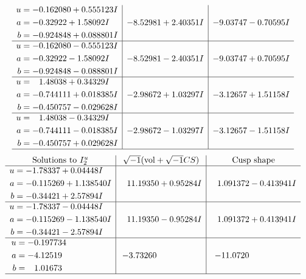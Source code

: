 \documentclass[1p]{elsarticle_modified}
\theoremstyle{definition}
\newcommand{\I}{\sqrt{-1}}
\begin{document}
$$\begin{array}{c|c|c}
\begin{aligned}
u &= -0.162080 + 0.555123 I \\
a &= -0.32922 + 1.58092 I \\
b &= -0.924848 + 0.088801 I\end{aligned}
 & -8.52981 + 2.40351 I & -9.03747 - 0.70595 I \\ \hline\begin{aligned}
u &= -0.162080 - 0.555123 I \\
a &= -0.32922 - 1.58092 I \\
b &= -0.924848 - 0.088801 I\end{aligned}
 & -8.52981 - 2.40351 I & -9.03747 + 0.70595 I \\ \hline\begin{aligned}
u &= \phantom{-}1.48038 + 0.34329 I \\
a &= -0.744111 + 0.018385 I \\
b &= -0.450757 - 0.029628 I\end{aligned}
 & -2.98672 + 1.03297 I & -3.12657 + 1.51158 I \\ \hline\begin{aligned}
u &= \phantom{-}1.48038 - 0.34329 I \\
a &= -0.744111 - 0.018385 I \\
b &= -0.450757 + 0.029628 I\end{aligned}
 & -2.98672 - 1.03297 I & -3.12657 - 1.51158 I\\
 \hline 
 \end{array}$$\newpage$$\begin{array}{c|c|c}  
\text{Solutions to }I^u_{2}& \I (\text{vol} + \sqrt{-1}CS) & \text{Cusp shape}\\
 \hline 
\begin{aligned}
u &= -1.78337 + 0.04448 I \\
a &= -0.115269 + 1.138540 I \\
b &= -0.34421 + 2.57894 I\end{aligned}
 & \phantom{-}11.19350 + 0.95284 I & \phantom{-}1.091372 - 0.413941 I \\ \hline\begin{aligned}
u &= -1.78337 - 0.04448 I \\
a &= -0.115269 - 1.138540 I \\
b &= -0.34421 - 2.57894 I\end{aligned}
 & \phantom{-}11.19350 - 0.95284 I & \phantom{-}1.091372 + 0.413941 I \\ \hline\begin{aligned}
u &= -0.197734\phantom{ +0.000000I} \\
a &= -4.12519\phantom{ +0.000000I} \\
b &= \phantom{-}1.01673\phantom{ +0.000000I}\end{aligned}
 & -3.73260\phantom{ +0.000000I} & -11.0720\phantom{ +0.000000I}\\
 \hline 
 \end{array}$$\newpage\newpage\renewcommand{\arraystretch}{1}
\end{document}
